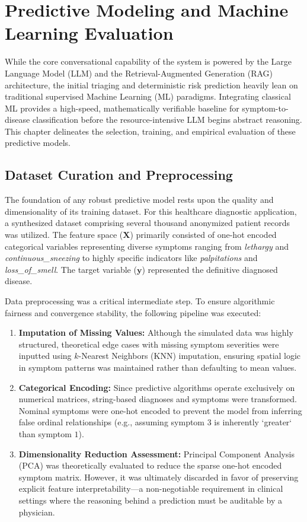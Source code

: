 \documentclass[12pt]{article}
\begin{document}
\section{Predictive Modeling and Machine Learning Evaluation}

While the core conversational capability of the system is powered by the Large Language Model (LLM) and the Retrieval-Augmented Generation (RAG) architecture, the initial triaging and deterministic risk prediction heavily lean on traditional supervised Machine Learning (ML) paradigms. Integrating classical ML provides a high-speed, mathematically verifiable baseline for symptom-to-disease classification before the resource-intensive LLM begins abstract reasoning. This chapter delineates the selection, training, and empirical evaluation of these predictive models.

\subsection{Dataset Curation and Preprocessing}
The foundation of any robust predictive model rests upon the quality and dimensionality of its training dataset. For this healthcare diagnostic application, a synthesized dataset comprising several thousand anonymized patient records was utilized. The feature space ($\textbf{X}$) primarily consisted of one-hot encoded categorical variables representing diverse symptoms ranging from \textit{lethargy} and \textit{continuous\_sneezing} to highly specific indicators like \textit{palpitations} and \textit{loss\_of\_smell}. The target variable ($\textbf{y}$) represented the definitive diagnosed disease.

Data preprocessing was a critical intermediate step. To ensure algorithmic fairness and convergence stability, the following pipeline was executed:
\begin{enumerate}
    \item \textbf{Imputation of Missing Values:} Although the simulated data was highly structured, theoretical edge cases with missing symptom severities were inputted using $k$-Nearest Neighbors (KNN) imputation, ensuring spatial logic in symptom patterns was maintained rather than defaulting to mean values.
    \item \textbf{Categorical Encoding:} Since predictive algorithms operate exclusively on numerical matrices, string-based diagnoses and symptoms were transformed. Nominal symptoms were one-hot encoded to prevent the model from inferring false ordinal relationships (e.g., assuming symptom $3$ is inherently `greater` than symptom $1$).
    \item \textbf{Dimensionality Reduction Assessment:} Principal Component Analysis (PCA) was theoretically evaluated to reduce the sparse one-hot encoded symptom matrix. However, it was ultimately discarded in favor of preserving explicit feature interpretability—a non-negotiable requirement in clinical settings where the reasoning behind a prediction must be auditable by a physician.
\end{enumerate}
\end{document}
